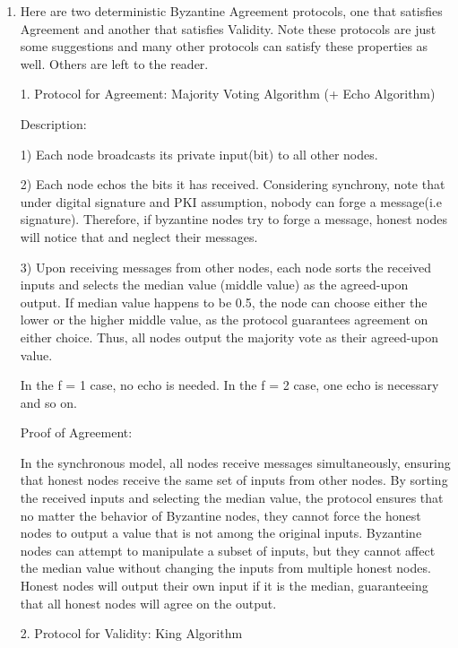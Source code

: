 \documentclass{article}
\begin{document}
\begin{enumerate}
\item %
 Here are two deterministic Byzantine Agreement protocols, one that satisfies Agreement and another that satisfies Validity. Note these protocols are just some suggestions and many other protocols can satisfy these properties as well. Others are left to the reader.  \par
1. Protocol for Agreement: Majority Voting Algorithm (+ Echo Algorithm) \par
Description: \par

1) Each node broadcasts its private input(bit) to all other nodes. \par
2) Each node echos the bits it has received. Considering synchrony, note that under digital signature and PKI assumption, nobody can forge a message(i.e signature). Therefore, if byzantine nodes try to forge a message, honest nodes will notice that and neglect their messages. \par
3) Upon receiving messages from other nodes, each node sorts the received inputs and selects the median value (middle value) as the agreed-upon output. If median value happens to be 0.5, the node can choose either the lower or the higher middle value, as the protocol guarantees agreement on either choice. Thus, all nodes output the majority vote as their agreed-upon value.  \par

In the f = 1 case, no echo is needed. In the f = 2 case, one echo is necessary and so on.

Proof of Agreement:

In the synchronous model, all nodes receive messages simultaneously, ensuring that honest nodes receive the same set of inputs from other nodes.
By sorting the received inputs and selecting the median value, the protocol ensures that no matter the behavior of Byzantine nodes, they cannot force the honest nodes to output a value that is not among the original inputs.
Byzantine nodes can attempt to manipulate a subset of inputs, but they cannot affect the median value without changing the inputs from multiple honest nodes.
Honest nodes will output their own input if it is the median, guaranteeing that all honest nodes will agree on the output.

2. Protocol for Validity: King Algorithm


\end{enumerate}
\end{document}
